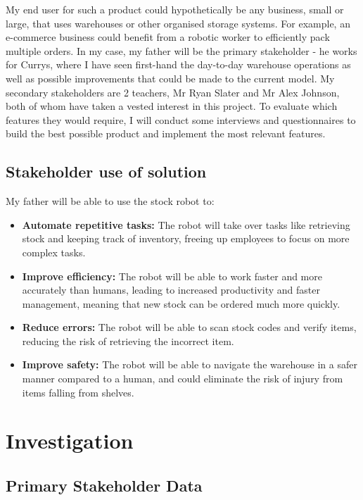 My end user for such a product could hypothetically be any business, small or large, that uses warehouses or other organised storage systems. For example, an e-commerce business could benefit from a robotic worker to efficiently pack multiple orders.
\textbf{\newline}
\newline
In my case, my father will be the primary stakeholder - he works for Currys, where I have seen first-hand the day-to-day warehouse operations as well as possible improvements that could be made to the current model. My secondary stakeholders are 2 teachers, Mr Ryan Slater and Mr Alex Johnson, both of whom have taken a vested interest in this project.
\newline
To evaluate which features they would require, I will conduct some interviews and questionnaires to build the best possible product and implement the most relevant features.


\subsection{Stakeholder use of solution}

My father will be able to use the stock robot to:

\begin{itemize}
    \item \textbf{Automate repetitive tasks:} The robot will take over tasks like retrieving stock and keeping track of inventory, freeing up employees to focus on more complex tasks.
    \item \textbf{Improve efficiency:} The robot will be able to work faster and more accurately than humans, leading to increased productivity and faster management, meaning that new stock can be ordered much more quickly.
    \item \textbf{Reduce errors:} The robot will be able to scan stock codes and verify items, reducing the risk of retrieving the incorrect item.
    \item \textbf{Improve safety:} The robot will be able to navigate the warehouse in a safer manner compared to a human, and could eliminate the risk of injury from items falling from shelves.
\end{itemize}


\section{Investigation}

\subsection{Primary Stakeholder Data}

